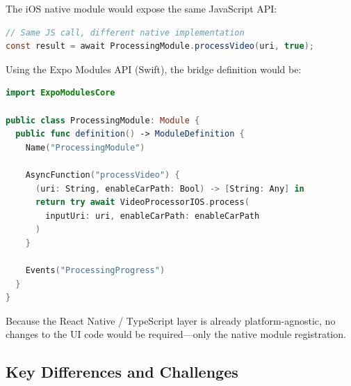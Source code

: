 \documentclass{zc-ust-hw}
\begin{document}
The iOS native module would expose the same JavaScript API:

\begin{lstlisting}[language=Java, caption={JavaScript call — identical API on both platforms.}]
// Same JS call, different native implementation
const result = await ProcessingModule.processVideo(uri, true);
\end{lstlisting}

Using the Expo Modules API (Swift), the bridge definition would be:

\begin{lstlisting}[language=Swift, caption={Expo Modules Swift bridge definition for iOS.}]
import ExpoModulesCore

public class ProcessingModule: Module {
  public func definition() -> ModuleDefinition {
    Name("ProcessingModule")

    AsyncFunction("processVideo") {
      (uri: String, enableCarPath: Bool) -> [String: Any] in
      return try await VideoProcessorIOS.process(
        inputUri: uri, enableCarPath: enableCarPath
      )
    }

    Events("ProcessingProgress")
  }
}
\end{lstlisting}

Because the React Native / TypeScript layer is already platform-agnostic, no changes to the UI code would be required—only the native module registration.

\subsection{Key Differences and Challenges}
\end{document}
